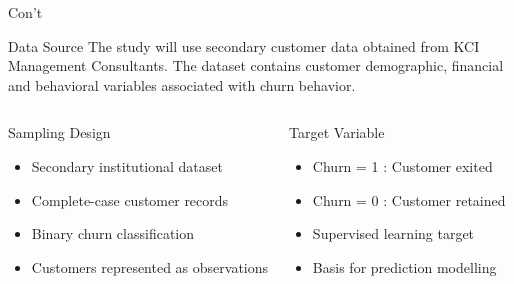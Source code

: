 \documentclass[10pt]{beamer}
\begin{document}
\begin{frame}{Con't}
	
	\small
	
	\begin{block}{Data Source}
		The study will use secondary customer data obtained from KCI Management Consultants. The dataset contains customer demographic, financial and behavioral variables associated with churn behavior.
	\end{block}
	
	\vspace{0.3cm}
	
	\begin{columns}
		
		
		\begin{alertblock}{Sampling Design}
			\begin{itemize}
				\item Secondary institutional dataset
				
				\item Complete-case customer records
				
				\item Binary churn classification
				
				\item Customers represented as observations
			\end{itemize}
		\end{alertblock}
		
		
		\begin{exampleblock}{Target Variable}
			\begin{itemize}
				\item Churn = 1 : Customer exited
				
				\item Churn = 0 : Customer retained
				
				\item Supervised learning target
				
				\item Basis for prediction modelling
			\end{itemize}
		\end{exampleblock}
		
	\end{columns}
	
\end{frame}
	
\end{document}
